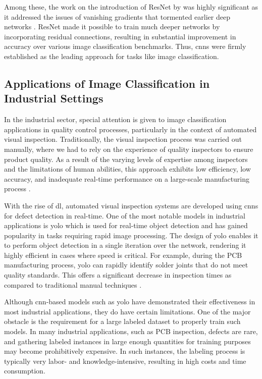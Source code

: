 Among these, the work on the introduction of ResNet by \cite{he2016deep} was highly significant as it addressed the issues of vanishing gradients that tormented earlier deep networks \cite{simonyan2015deepconvolutionalnetworkslargescale} \cite{7298594}. ResNet made it possible to train much deeper networks by incorporating residual connections, resulting in substantial improvement in accuracy over various image classification benchmarks. Thus, \glspl{cnn} were firmly established as the leading approach for tasks like image classification.

\subsection{Applications of Image Classification in Industrial Settings}

In the industrial sector, special attention is given to image classification applications in quality control processes, particularly in the context of automated visual inspection. Traditionally, the visual inspection process was carried out manually, where we had to rely on the experience of quality inspectors to ensure product quality. As a result of the varying levels of expertise among inspectors and the limitations of human abilities, this approach exhibits low efficiency, low accuracy, and inadequate real-time performance on a large-scale manufacturing process \cite{Gong_2020}.

With the rise of \gls{dl}, automated visual inspection systems are developed using \glspl{cnn} for defect detection in real-time. One of the most notable models in industrial applications is \gls{yolo} which is used for real-time object detection and has gained popularity in tasks requiring rapid image processing. The design of \gls{yolo} enables it to perform object detection in a single iteration over the network, rendering it highly efficient in cases where speed is critical. For example, during the PCB manufacturing process, \gls{yolo} can rapidly identify solder joints that do not meet quality standards. This offers a significant decrease in inspection times as compared to traditional manual techniques \cite{redmon2016you}.

Although \gls{cnn}-based models such as \gls{yolo} have demonstrated their effectiveness in most industrial applications, they do have certain limitations. One of the major obstacle is the requirement for a large labeled dataset to properly train such models. In many industrial applications, such as PCB inspection, defects are rare, and gathering labeled instances in large enough quantities for training purposes may become prohibitively expensive. In such instances, the labeling process is typically very labor- and knowledge-intensive, resulting in high costs and time consumption\cite{FINK2020103678}.

